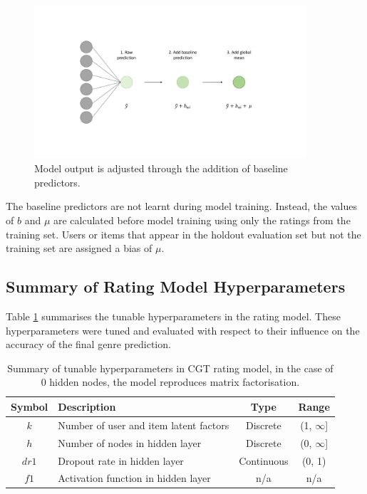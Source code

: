 \begin{figure}[H]
\centering
\includegraphics[width=0.9\textwidth]{Figures/4_CGT-output-layer.pdf}
\decoRule
\caption[Rating layer]{Model output is adjusted through the addition of baseline predictors.}
\label{fig:4_CGT-rating-layer}
\end{figure}

The baseline predictors are not learnt during model training. Instead, the values of $b$ and $\mu$ are calculated before model training using only the ratings from the training set. Users or items that appear in the holdout evaluation set but not the training set are assigned a bias of $\mu$.

\subsection{Summary of Rating Model Hyperparameters}
Table \ref{tab:rating-hparams} summarises the tunable hyperparameters in the rating model. These hyperparameters were tuned and evaluated with respect to their influence on the accuracy of the final genre prediction.
\begin{table}[H]
\centering
\begin{tabular}{c | p{3.5cm} | c | c}
\toprule
\textbf{Symbol} & \textbf{Description} & \textbf{Type} & \textbf{Range} \\
\midrule
$k$ & Number of user and item latent factors & Discrete & (1, $\infty$] \\
\midrule
$h$ & Number of nodes in hidden layer & Discrete & (0, $\infty$] \\
\midrule
$dr1$ & Dropout rate in hidden layer & Continuous & (0, 1) \\
\midrule
$f1$ & Activation function in hidden layer & n/a & n/a \\
\bottomrule
\end{tabular}
\caption[Rating model hyperparameters]{Summary of tunable hyperparameters in CGT rating model, in the case of 0 hidden nodes, the model reproduces matrix factorisation.}
\label{tab:rating-hparams}
\end{table}

